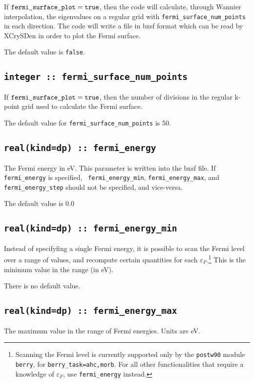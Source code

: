 If $\verb#fermi_surface_plot#=\verb#true#$, then the code will calculate,
through Wannier interpolation, the
eigenvalues on a regular grid with \verb#fermi_surface_num_points# in
each direction. The code will write a file in bxsf format which can be
read by XCrySDen in order to plot the Fermi surface.

The default value is \verb#false#.


\subsection[fermi\_surface\_num\_points]{\tt integer :: fermi\_surface\_num\_points}

If $\verb#fermi_surface_plot#=\verb#true#$, then the number of divisions in
the regular k-point grid used to calculate the Fermi surface.

The default value for \verb#fermi_surface_num_points# is 50.


\subsection[fermi\_energy]{\tt real(kind=dp) :: fermi\_energy}
The Fermi energy in eV. This parameter is written into the bxsf file.
If {\tt fermi\_energy} is specified, {\tt
    fermi\_energy\_min}, {\tt fermi\_energy\_max}, and {\tt
    fermi\_energy\_step} should not be specified, and vice-versa.


The default value is 0.0


\subsection[fermi\_energy]{\tt real(kind=dp) :: fermi\_energy\_min}
Instead of specifyfing a single Fermi energy, it is possible to scan
the Fermi level over a range of values, and recompute certain
quantities for each $\varepsilon_F$.\footnote{Scanning the Fermi level
  is currently supported only by the {\tt postw90} module {\tt berry},
  for {\tt berry\_task=ahc,morb}. For all other functionalities that
  require a knowledge of $\varepsilon_F$, use {\tt fermi\_energy}
  instead.}  This is the minimum value in the range (in eV).

There is no default value.

\subsection[fermi\_energy]{\tt real(kind=dp) :: fermi\_energy\_max}
The maximum value in the range of Fermi energies. Units are eV.

